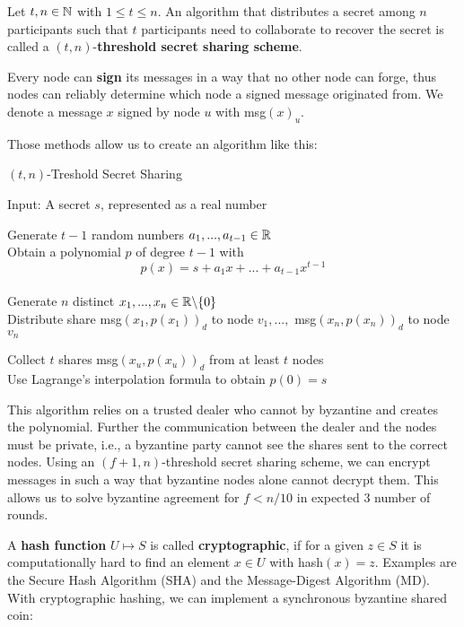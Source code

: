 Let $t, n \in \mathbb{N}$ with $1 \leq t \leq n$. An algorithm that distributes a secret among $n$ participants such that $t$ participants need to collaborate to recover the secret is called a $(t, n)$-\textbf{threshold secret sharing scheme}. \medskip

Every node can \textbf{sign} its messages in a way that no other node can forge, thus nodes can reliably determine which node a signed message originated from. We denote a message $x$ signed by node $u$ with msg$(x)_u$.

Those methods allow us to create an algorithm like this: \medskip

\begin{algorithm}[H]
\caption{$(t, n)$-Treshold Secret Sharing}
	Input: A secret $s$, represented as a real number 
	
	\BlankLine
	\BlankLine
	
	Generate $t-1$ random numbers $a_1, ..., a_{t-1} \in \mathbb{R}$ \\
	Obtain a polynomial $p$ of degree $t-1$ with $$p(x) = s + a_1x + ... + a_{t-1}x^{t-1}$$ \\
	Generate $n$ distinct $x_1, ..., x_n \in \mathbb{R} \backslash \{0\}$ \\
	Distribute share msg$(x_1, p(x_1))_d$ to node $v_1, ...,$ msg$(x_n, p(x_n))_d$ to node $v_n$ 
	
	\BlankLine
	\BlankLine
	
	Collect $t$ shares msg$(x_u,p(x_u))_d$ from at least $t$ nodes \\
	Use Lagrange's interpolation formula to obtain $p(0) = s$
	
\end{algorithm}
\medskip

This algorithm relies on a trusted dealer who cannot by byzantine and creates the polynomial. Further the communication between the dealer and the nodes must be private, i.e., a byzantine party cannot see the shares sent to the correct nodes. Using an $(f + 1, n)$-threshold secret sharing scheme, we can encrypt messages in such a way that byzantine nodes alone cannot decrypt them. This allows us to solve byzantine agreement for $f < n/10$ in expected $3$ number of rounds. \medskip

A\textbf{ hash function} $U \mapsto S$ is called \textbf{cryptographic}, if for a given $z \in S$ it is computationally hard to find an element $x \in U$ with hash$(x) = z$. Examples are the Secure Hash Algorithm (SHA) and the Message-Digest Algorithm (MD). With cryptographic hashing, we can implement a synchronous byzantine shared coin: \medskip

